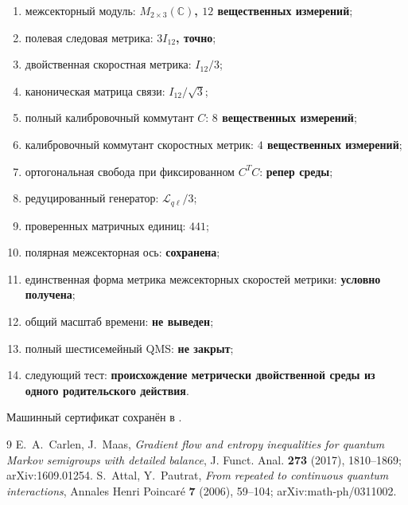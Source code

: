 \begin{protocol}
\begin{enumerate}
 \item межсекторный модуль: \textbf{$M_{2\times3}(\mathbb C)$, $12$ вещественных измерений};
 \item полевая следовая метрика: \textbf{$3I_{12}$, точно};
 \item двойственная скоростная метрика: \textbf{$I_{12}/3$};
 \item каноническая матрица связи: \textbf{$I_{12}/\sqrt3$};
 \item полный калибровочный коммутант $C$: \textbf{$8$ вещественных измерений};
 \item калибровочный коммутант скоростных метрик: \textbf{$4$ вещественных измерений};
 \item ортогональная свобода при фиксированном $C^TC$: \textbf{репер среды};
 \item редуцированный генератор: \textbf{$\mathcal L_{q\ell}/3$};
 \item проверенных матричных единиц: \textbf{$441$};
 \item полярная межсекторная ось: \textbf{сохранена};
 \item единственная форма метрика межсекторных скоростей метрики: \textbf{условно получена};
 \item общий масштаб времени: \textbf{не выведен};
 \item полный шестисемейный QMS: \textbf{не закрыт};
 \item следующий тест: \textbf{происхождение метрически двойственной среды
       из одного родительского действия}.
\end{enumerate}
\end{protocol}

Машинный сертификат сохранён в
.

\begin{thebibliography}{9}
E.~A.~Carlen, J.~Maas,
\emph{Gradient flow and entropy inequalities for quantum Markov semigroups
with detailed balance}, J. Funct. Anal. \textbf{273} (2017), 1810--1869;
arXiv:1609.01254.
S.~Attal, Y.~Pautrat,
\emph{From repeated to continuous quantum interactions},
Annales Henri Poincar\'e \textbf{7} (2006), 59--104;
arXiv:math-ph/0311002.
\end{thebibliography}